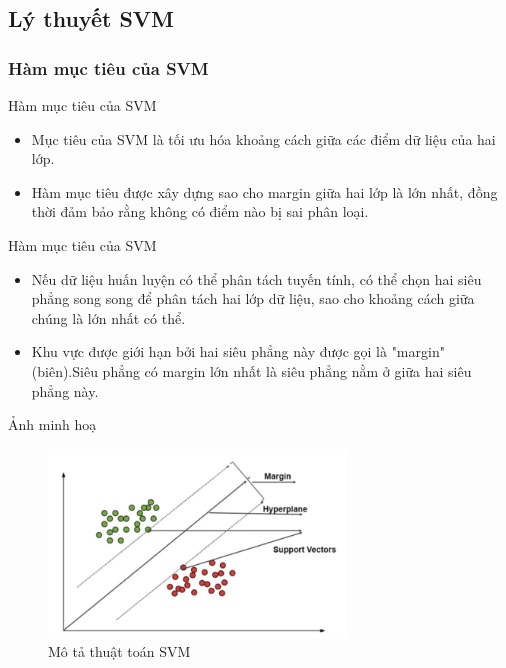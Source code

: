 \documentclass[serif, aspectratio=169]{beamer}
\begin{document}
	\subsection{Lý thuyết SVM}
	\subsubsection{Hàm mục tiêu của SVM}
	\begin{frame}{Hàm mục tiêu của SVM}
		\begin{itemize}
			\item Mục tiêu của SVM là tối ưu hóa khoảng cách giữa các điểm dữ liệu của hai lớp. 
			\item Hàm mục tiêu được xây dựng sao cho margin giữa hai lớp là lớn nhất, đồng thời đảm bảo rằng không có điểm nào bị sai phân loại.
		\end{itemize}
		
	\end{frame}
	
	\begin{frame}{Hàm mục tiêu của SVM}
		\begin{itemize}
			\item Nếu dữ liệu huấn luyện có thể phân tách tuyến tính, có thể chọn hai siêu phẳng song song để phân tách hai lớp dữ liệu, sao cho khoảng cách giữa chúng là lớn nhất có thể. 
			\item Khu vực được giới hạn bởi hai siêu phẳng này được gọi là "margin" (biên).Siêu phẳng có margin lớn nhất là siêu phẳng nằm ở giữa hai siêu phẳng này. 
		\end{itemize}
		
	\end{frame}
	
	\begin{frame}{Ảnh minh hoạ}
		\begin{figure}
			\centering
			\includegraphics[height=5cm]{pic/svm.png}
			\caption{Mô tả thuật toán SVM}
			\label{fig:svm}
		\end{figure}
		
	\end{frame}
	
\end{document}
